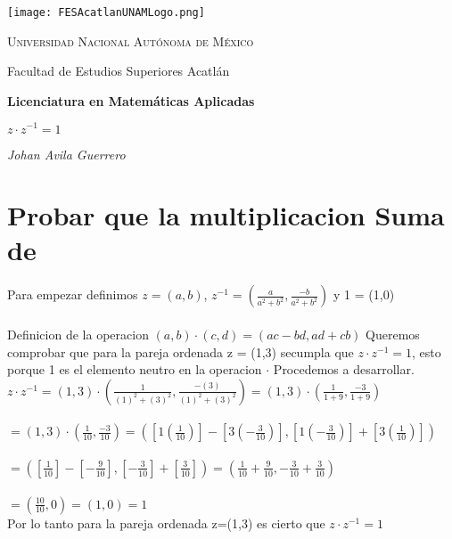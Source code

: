 \documentclass[a4paper,12pt]{article}
\begin{document}
\begin{titlepage}
    \centering
    \texttt{[image: FESAcatlanUNAMLogo.png]} %
    \vspace{1cm}
    
    {\scshape\large Universidad Nacional Autónoma de México \par}
    {\large Facultad de Estudios Superiores Acatlán \par}
    \vspace{1.5cm}
    
    {\Large\bfseries Licenciatura en Matemáticas Aplicadas \par}
    \vspace{2cm}
    
    {\Huge\bfseries  \(z \cdot z^{-1} = 1 \)  \par}
    \vspace{2cm}
    
    {\Large\itshape Johan Avila Guerrero \par}
    \vfill
    
    
    \vfill
    
\end{titlepage}



\section*{Probar que la multiplicacion Suma de }
\noindent 
    Para empezar definimos \(z=(a, b) \), \( z^{-1}= (\frac{a}{a^2+b^2}, \frac{-b}{a^2+b^2}  )\)  y 1 = (1,0)\\ \\
    Definicion de la operacion  \((a,b)\cdot (c,d) = (ac-bd, ad+cb)\)
    Queremos comprobar que para la pareja ordenada z = (1,3) secumpla que \(z \cdot z^{-1} = 1\), esto porque 1 es el elemento neutro en la operacion \(\cdot\)
    Procedemos a desarrollar. \\

    \(z \cdot z^{-1} = (1,3) \cdot (\frac{1}{(1)^2 + (3)^2}, \frac{-(3)}{(1)^2 + (3)^2} )  = (1,3) \cdot (\frac{1}{1 + 9}, \frac{-3}{1 + 9} ) \) \\ \\

    \(= (1,3) \cdot (\frac{1}{10}, \frac{-3}{10} ) = ( [1 (\frac{1}{10})] - [3 (-\frac{3}{10})], [1(-\frac{3}{10})] + [3(\frac{1}{10})] )\) \\\\

\(= ([\frac{1}{10}] - [-\frac{9}{10}] , [-\frac{3}{10}] + [\frac{3}{10}]  ) = (\frac{1}{10} + \frac{9}{10} , -\frac{3}{10} + \frac{3}{10}  ) \) \\\\

\(= (\frac{10}{10}  , 0  )  = (1, 0) = 1\) \\

Por lo tanto para la pareja ordenada z=(1,3) es cierto que \(z \cdot z^{-1} = 1\)

    
 
\end{document}
